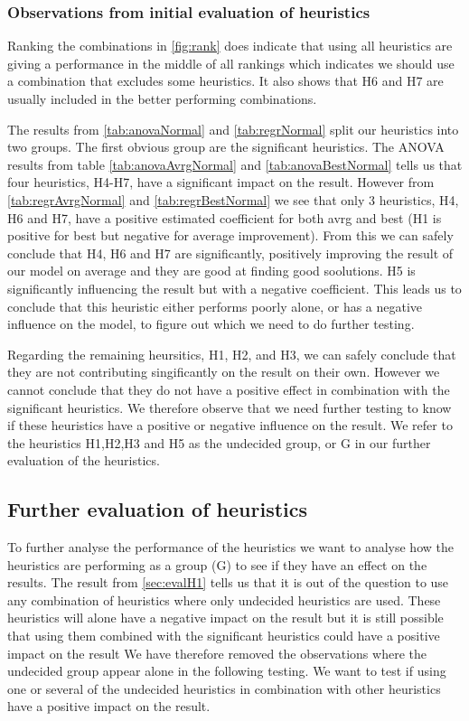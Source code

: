 \documentclass[../main.tex]{subfiles}
\begin{document}
\subsubsection{Observations from initial evaluation of heuristics}
Ranking the combinations in \cref{fig:rank} does indicate that using all heuristics are giving a performance in the middle of all rankings which indicates we should use a combination that excludes some heuristics. 
It also shows that H6 and H7 are usually included in the better performing combinations. \par 
The results from \cref{tab:anovaNormal} and \cref{tab:regrNormal} split our heuristics into two groups. 
The first obvious group are the significant heuristics.
The ANOVA results from table \cref{tab:anovaAvrgNormal} and \cref{tab:anovaBestNormal} tells us that four heuristics, H4-H7, have a significant impact on the result.
However from \cref{tab:regrAvrgNormal} and \cref{tab:regrBestNormal} we see that only 3 heuristics, H4, H6 and H7, have a positive estimated coefficient for both avrg and best (H1 is positive for best but negative for average improvement).
From this we can safely conclude that H4, H6 and H7 are significantly, positively improving the result of our model on average and they are good at finding good soolutions. 
H5 is significantly influencing the result but with a negative coefficient. 
This leads us to conclude that this heuristic either performs poorly alone, or has a negative influence on the model, to figure out which we need to do further testing.
\par
Regarding the remaining heursitics, H1, H2, and H3, we can safely conclude that they are not contributing singificantly on the result on their own. 
However we cannot conclude that they do not have a positive effect in combination with the significant heuristics. 
We therefore observe that we need further testing to know if these heuristics have a positive or negative influence on the result.
We refer to the heuristics H1,H2,H3 and H5 as the undecided group, or G in our further evaluation of the heuristics.

\subsection{Further evaluation of heuristics}
\label{sec:evalH2}
To further analyse the performance of the heuristics we want to analyse how the heuristics are performing as a group (G) to see if they have an effect on the results.
The result from \cref{sec:evalH1} tells us that it is out of the question to use any combination of heuristics where only undecided heuristics are used.
These heuristics will alone have a negative impact on the result but it is still possible that using them combined with the significant heuristics could have a positive impact on the result
We have therefore removed the observations where the undecided group appear alone in the following testing.
We want to test if using one or several of the undecided heuristics in combination with other heuristics have a positive impact on the result.
\end{document}
